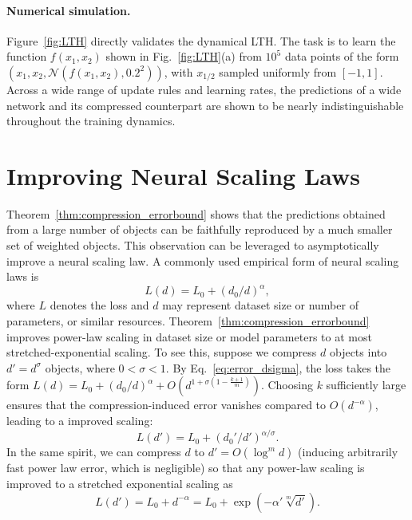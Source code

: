 \documentclass{article}
\theoremstyle{plain}
\begin{document}
\vspace{-2mm}
\paragraph{Numerical simulation.}  
Figure~\ref{fig:LTH} directly validates the dynamical LTH. The task is to learn the function $f(x_1,x_2)$ shown in Fig.~\ref{fig:LTH}(a) from $10^5$ data points of the form $(x_1, x_2, \mathcal{N}(f(x_1, x_2), 0.2^2))$, with $x_{1/2}$ sampled uniformly from $[-1,1]$. Across a wide range of update rules and learning rates, the predictions of a wide network and its compressed counterpart are shown to be nearly indistinguishable throughout the training dynamics. 



\vspace{-2mm}
\section{Improving Neural Scaling Laws}\label{sec:NSL}
\vspace{-1mm}

Theorem~\ref{thm:compression_errorbound} shows that the predictions obtained from a large number of objects can be faithfully reproduced by a much smaller set of weighted objects. This observation can be leveraged to asymptotically improve a neural scaling law. A commonly used empirical form of neural scaling laws is \citep{henighan2020scalinglawsauto}
\begin{equation}
    L(d) = L_0 + (d_0/d)^{\alpha},
\end{equation}
where $L$ denotes the loss and $d$ may represent dataset size or number of parameters, or similar resources. Theorem~\ref{thm:compression_errorbound} improves power-law scaling in dataset size or model parameters to at most stretched-exponential scaling. To see this, suppose we compress $d$ objects into $d' = d^\sigma$ objects, where $0 < \sigma < 1$. By Eq.~\eqref{eq:error_dsigma}, the loss takes the form $
L(d) = L_0 + (d_0/d)^{\alpha} + O(d^{1+\sigma(1-\tfrac{k+1}{m})})$. Choosing $k$ sufficiently large ensures that the compression-induced error vanishes compared to $O(d^{-\alpha})$, leading to a improved scaling:
\begin{equation}
    L(d') = L_0 + (d_0'/d')^{\alpha/\sigma}.
\end{equation}
In the same spirit, we can compress $d$ to $d'=O(\log^m d)$ (inducing arbitrarily fast power law error, which is negligible) so that any power-law scaling is improved to a stretched exponential scaling as
\begin{equation}
    L(d') = L_0 + d^{-\alpha} = L_0 + \exp(-\alpha' \sqrt[m]{d'})   .
\end{equation}
\end{document}

